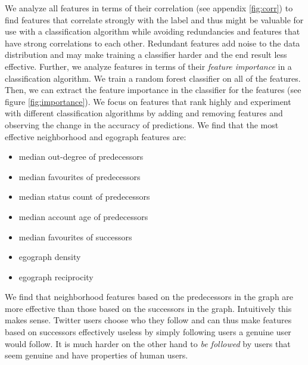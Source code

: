 We analyze all features in terms of their correlation (see appendix \ref{fig:corr}) to find features that correlate strongly with the label and thus might be valuable for use with a classification algorithm while avoiding redundancies and features that have strong correlations to each other. Redundant features add noise to the data distribution and may make training a classifier harder and the end result less effective. Further, we analyze features in terms of their \emph{feature importance} in a classification algorithm. We train a random forest classifier on all of the features. Then, we can extract the feature importance in the classifier for the features (see figure \ref{fig:importance}). We focus on features that rank highly and experiment with different classification algorithms by adding and removing features and observing the change in the accuracy of predictions. We find that the most effective neighborhood and egograph features are:
\begin{itemize}
    \item median out-degree of predecessors
    \item median favourites of predecessors
    \item median status count of predecessors
    \item median account age of predecessors
    \item median favourites of successors
    \item egograph density
    \item egograph reciprocity
\end{itemize}
We find that neighborhood features based on the predecessors in the graph are more effective than those based on the successors in the graph. Intuitively this makes sense. Twitter users choose who they follow and can thus make features based on successors effectively useless by simply following users a genuine user would follow. It is much harder on the other hand to \emph{be followed} by users that seem genuine and have properties of human users.